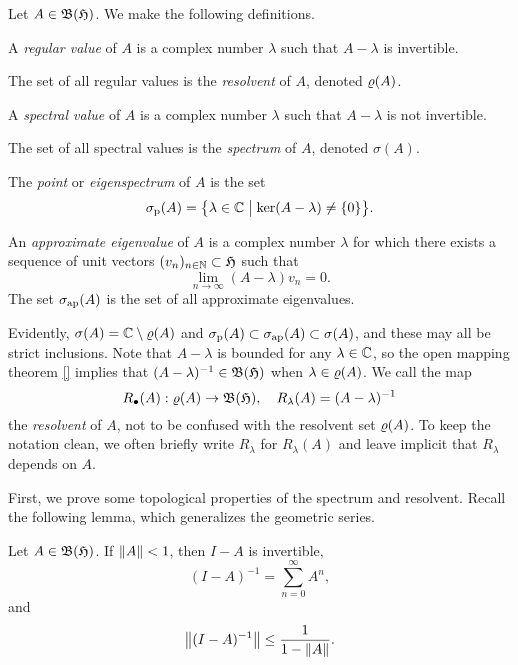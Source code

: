\begin{definition}
Let $A \in \mathfrak{B}(\mathfrak{H})$. We make the following definitions.
\begin{romanlist}
  \item A \emph{regular value} of $A$ is a complex number $\lambda$ such that $A-\lambda$ is invertible.
  \item The set of all regular values is the \emph{resolvent} of $A$, denoted $\varrho(A)$.
  \item A \emph{spectral value} of $A$ is a complex number $\lambda$ such that $A - \lambda$ is not 
        invertible.
  \item The set of all spectral values is the \emph{spectrum} of $A$, denoted $\sigma(A)$.
  \item The \emph{point} or \emph{eigenspectrum} of $A$ is the set
	\[
	\sigma_\textup{p}(A) = \big\{\lambda \in \mathbb{C} \bigm\vert \ker(A - \lambda) \neq \{0 \} \big\}.
	\]
  \item An \emph{approximate eigenvalue} of $A$ is a complex number $\lambda$ for which there exists 
        a sequence of unit vectors $(v_n)_{n\in \mathbb{N}}\subset \mathfrak{H}$ such that
	\[
   	   \lim_{n \rightarrow \infty} (A - \lambda)v_n = 0.
	\]
	The set $\sigma_\textup{ap}(A)$ is the set of all approximate eigenvalues.
\end{romanlist}
\para 
Evidently, $\sigma(A) = \mathbb{C} \setminus \varrho(A)$ and $\sigma_\textup{p}(A) \subset \sigma_\textup{ap}(A) \subset \sigma(A)$,
and these may all be strict inclusions. Note that $A - \lambda$ is bounded for any $\lambda \in \mathbb{C}$, 
so the open mapping theorem \ref{} implies that $(A - \lambda)^{-1} \in \mathfrak{B}(\mathfrak{H})$ when $\lambda \in \varrho(A)$.
We call the map 
\[
  R_\bullet (A ):\varrho(A) \rightarrow \mathfrak{B}(\mathfrak{H}), \quad R_\lambda (A) = (A-\lambda)^{-1}
\]
the \emph{resolvent} of $A$, not to be confused with the resolvent set $\varrho(A)$. 
To keep the notation clean, we often briefly write $R_\lambda$ for $R_\lambda(A)$ and leave implicit that $R_\lambda$ depends on $A$.
\end{definition}
First, we prove some topological properties of the spectrum and resolvent. Recall the following lemma, which generalizes the geometric series.

\begin{lemma}\label{thm:neumann-series} Let $A \in \mathfrak{B}(\mathfrak{H})$. If $\left\|A\right\| < 1$, then $I - A$ is invertible,
\[
(I - A)^{-1} = \sum_{n=0}^\infty A^n,
\]
and
\[
\left\|(I-A)^{-1}\right\| \leq \frac{1}{1 - \left\|A\right\|}.
\]
\end{lemma}

